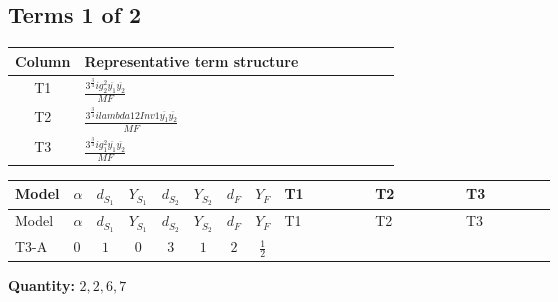 \documentclass[8pt]{article}
\begin{document}
\begin{landscape}
\subsection*{Terms 1 of 2}
\begin{center}
\begin{tabular}{@{}c >{\raggedright\arraybackslash}p{0.82\linewidth}@{}}
\toprule
Column & Representative term structure \\
\midrule
T1 & \(\displaystyle \frac{3^{\frac{3}{4}} i g_{2}^{2} \overline{y_{1}} \overline{y_{2}}}{MF}\) \\
\midrule
T2 & \(\displaystyle \frac{3^{\frac{3}{4}} i lambda12Inv1 \overline{y_{1}} \overline{y_{2}}}{MF}\) \\
\midrule
T3 & \(\displaystyle \frac{3^{\frac{3}{4}} i g_{1}^{2} \overline{y_{1}} \overline{y_{2}}}{MF}\) \\
\midrule
\bottomrule
\end{tabular}
\end{center}
\smallskip
\tiny
\begin{longtable}{@{}llcccccc >{\raggedright\arraybackslash}p{0.21\linewidth} >{\raggedright\arraybackslash}p{0.21\linewidth} >{\raggedright\arraybackslash}p{0.21\linewidth}@{}}
\toprule
Model & $\alpha$ & $d_{S_1}$ & $Y_{S_1}$ & $d_{S_2}$ & $Y_{S_2}$ & $d_F$ & $Y_F$ & T1 & T2 & T3 \\
\midrule
\endfirsthead
\toprule
Model & $\alpha$ & $d_{S_1}$ & $Y_{S_1}$ & $d_{S_2}$ & $Y_{S_2}$ & $d_F$ & $Y_F$ & T1 & T2 & T3 \\
\midrule
\endhead
T3-A & $0$ & $1$ & $0$ & $3$ & $1$ & $2$ & $\frac{1}{2}$ & \scriptsize\adjustbox{max width=\linewidth}{$\begin{gathered} - \frac{17 \cdot 3^{\frac{3}{4}} i g_{2}^{2} \overline{y_{1}} \overline{y_{2}}}{24 MF}\end{gathered}$} & \scriptsize\adjustbox{max width=\linewidth}{$\begin{gathered} - \frac{3^{\frac{3}{4}} i lambda12Inv1 \overline{y_{1}} \overline{y_{2}}}{6 MF}\end{gathered}$} & \scriptsize\adjustbox{max width=\linewidth}{$\begin{gathered} - \frac{3^{\frac{3}{4}} i g_{1}^{2} \overline{y_{1}} \overline{y_{2}}}{8 MF}\end{gathered}$} \\
\midrule
\bottomrule
\end{longtable}
\clearpage
\noindent\textbf{Quantity: }$\mathrm{2,2,6,7}$\par\smallskip

\end{landscape}
\end{document}
